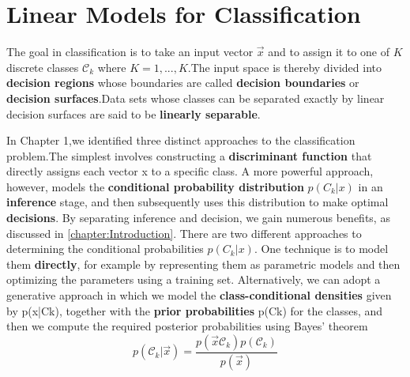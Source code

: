 \chapter{Linear Models for Classification}
\label{Linear Models for Classification}
The goal in classification is to take an input vector $\vec{x}$ and to assign it to one of $K$ discrete classes $\mathcal{C}_k$ where $K = 1,...,K$.The input space is thereby divided into \textbf{decision regions} whose boundaries are called \textbf{decision boundaries} or \textbf{decision surfaces}.Data sets whose classes can be separated exactly by linear decision surfaces are said to be \textbf{linearly separable}.

In Chapter 1,we identified three distinct approaches to the classification problem.The simplest involves constructing a \textbf{discriminant function} that directly assigns
each vector x to a specific class. A more powerful approach, however, models the \textbf{conditional probability distribution} $p(C_k|x)$ in an \textbf{inference} stage, and then subsequently uses this distribution to make optimal \textbf{decisions}. By separating inference and decision, we gain numerous benefits, as discussed in \ref{chapter:Introduction}. There are two different approaches to determining the conditional probabilities $p(C_k|x)$. One technique is to model them \textbf{directly}, for example by representing them as parametric models and then optimizing the parameters using a training set. Alternatively, we can adopt a generative approach in which we model the \textbf{class-conditional densities} given by p(x|Ck), together with the \textbf{prior probabilities} p(Ck) for the classes, and then we compute the required posterior probabilities using Bayes’ theorem
\begin{equation}
p(\mathcal{C}_k|\vec{x}) = \dfrac{p(\vec{x}\mathcal{C}_k)p(\mathcal{C}_k)}{p(\vec{x})}
\end{equation}

